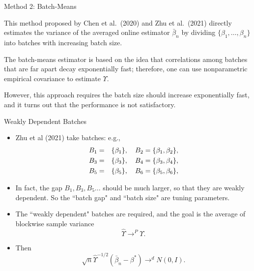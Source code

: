 \documentclass[beamer, t]{beamer}
\begin{document}
\begin{frame}{Method 2: Batch-Means}



This method proposed by Chen et al.~(2020) and Zhu et al.~(2021) directly estimates the variance of the averaged online estimator $\bar{\beta}_{n}$
by dividing $\{\beta_1,\ldots,\beta_n\}$ into batches with increasing
batch size.

\bigskip 
The batch-means estimator is based on the idea that correlations among batches that are far apart decay exponentially fast; therefore, one can use nonparametric empirical covariance to estimate $\Upsilon$.

\bigskip
However, this approach requires the batch size should increase exponentially fast, and it turns out that the performance is not satisfactory. 
\end{frame}

  
\begin{frame}{Weakly Dependent Batches}
	
	
	
	\begin{itemize}
		\item Zhu et al (2021)  take batches: e.g.,
		\begin{eqnarray*}
			B_1&=& \{\beta_1\}, \quad B_2=\{\beta_1, \beta_2\},  \cr
			B_3&=&\{\beta_3 \}, \quad B_4=\{\beta_3, \beta_4 \}, \cr
			B_5&=&\{\beta_5 \},\quad B_6=\{\beta_5, \beta_6 \},
		\end{eqnarray*}
		
		\item        		In fact, the gap $B_1, B_3, B_5...$ should be much larger, so that they are weakly dependent.  So the ``batch gap" and ``batch size" are tuning parameters. 
		
		\item The ``weakly dependent" batches are required, and the goal is  the average of blockwise sample variance
		$$
		\widehat \Upsilon  \to ^ P \Upsilon.
		$$	
		
		\item Then
		$$
		\sqrt{n}\widehat \Upsilon^{-1/2}(\bar\beta_n-\beta^*) \to^d N(0, I).
		$$
		
	\end{itemize} 
	
	
\end{frame} 	
\end{document}
